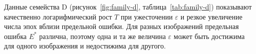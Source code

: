 Данные семейства D (рисунок~\ref{fig:family-d}, таблица~\ref{tab:family-d}) показывают качественно логарифмический рост $T$ при ужесточении $\varepsilon$ и резкое увеличение числа эпох вблизи предельной ошибки. Для разных изображений предельная ошибка $E^*$ различна, поэтому одна и та же величина $\varepsilon$ может быть достижима для одного изображения и недостижима для другого.
